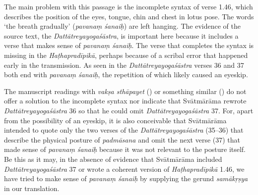 \begin{ekdosis}
\begin{philcomm}[hp01_045]

The main problem with this passage is the incomplete syntax of verse 1.46, which describes the position of the eyes, tongue, chin and chest in lotus pose. The words `the breath gradually' (\emph{pavanaṃ śanaiḥ}) are left hanging. The evidence of the source text, the \emph{Dattātreyayogaśāstra}, is important here because it includes a verse that makes sense of \emph{pavanaṃ śanaiḥ}. The verse that completes the syntax is missing in the \emph{Haṭhapradīpikā}, perhaps because of a scribal error that happened early in the transmission. As seen in the \emph{Dattātreyayogaśāstra} verses 36 and 37 both end with \emph{pavanaṃ śanaiḥ}, the repetition of which likely caused an eyeskip.

\begin{versinnote}
\end{versinnote}

The manuscript readings with \emph{vakṣa sthāpayet} () or something similar () do not offer a solution to the incomplete syntax nor indicate that Svātmārāma rewrote \emph{Dattātreyayogaśāstra} 36 so that he could omit \emph{Dattātreyayogaśāstra} 37. For, apart from the possibility of an eyeskip, it is also conceivable that Svātmārāma intended to quote only the two verses of the \emph{Dattātreyayogaśāstra} (35–36) that describe the physical posture of \emph{padmāsana} and omit the next verse (37) that made sense of \emph{pavanaṃ śanaiḥ} because it was not relevant to the posture itself. Be this as it may, in the absence of evidence that Svātmārāma included \emph{Dattātreyayogaśāstra} 37 or wrote a coherent version of \emph{Haṭhapradīpikā} 1.46, we have tried to make sense of \emph{pavanaṃ śanaiḥ} by supplying the gerund \emph{samākṛṣya} in our translation. 


\end{philcomm}
\end{ekdosis}
